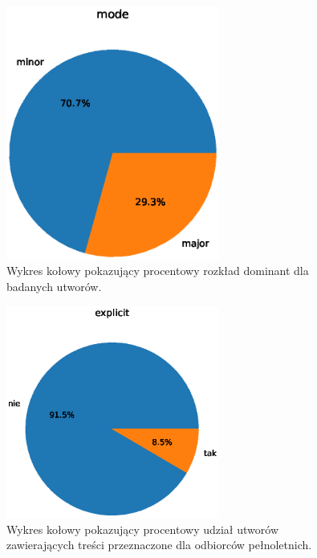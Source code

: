 \documentclass[a4paper,11pt]{article}
\begin{document}
    \smallskip

    \begin{figure}[H]
        \label{fig:mode}
        \centering
        \includegraphics[width=7cm,keepaspectratio]{mode}
        \caption{Wykres kołowy pokazujący procentowy rozkład dominant dla badanych utworów.}
    \end{figure}

    \smallskip

    \begin{figure}[H]
        \label{fig:explicit}
        \centering
        \includegraphics[width=7cm,keepaspectratio]{explicit}
        \caption{Wykres kołowy pokazujący procentowy udział utworów zawierających treści przeznaczone dla odbiorców pełnoletnich.}
    \end{figure}

    \smallskip
\end{document}
